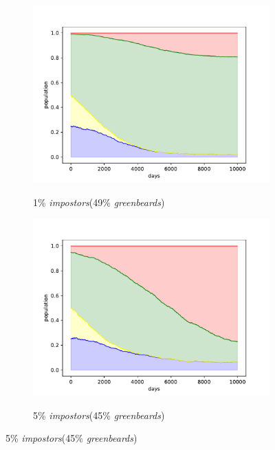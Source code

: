 \documentclass[sigconf]{acmart}
\newcommand{\impostors}{\textit{impostors}\xspace}
\newcommand{\greenbeards}{\textit{greenbeards}\xspace}
\begin{document}
    \begin{figure}
        \begin{subfigure}[b]{0.475\textwidth}
            \centering
            \includegraphics[width=\textwidth]{figures/exp4_impostor_rel_1}
            \label{fig:1_imp}
            \caption{1\% \impostors (49\% \greenbeards)}
        \end{subfigure}
        \hfill
        \begin{subfigure}[b]{0.475\textwidth}
            \centering
            \includegraphics[width=\textwidth]{figures/exp4_impostor_rel_5}
            \label{fig:5_imp}
            \caption{5\% \impostors (45\% \greenbeards)}
        \end{subfigure}

\end{figure}
\end{document}
